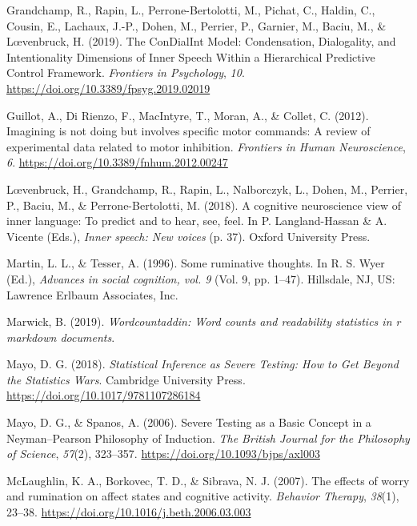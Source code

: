 \documentclass[
  english,
  man, donotrepeattitle,mask,floatsintext]{apa6}
\newlength{\cslhangindent}
\newlength{\cslentryspacingunit} %
\newenvironment{CSLReferences}[2] %
 {%
  \setlength{\parindent}{0pt}
  \ifodd #1
  \let\oldpar\par
  \def\par{\hangindent=\cslhangindent\oldpar}
  \fi
  \setlength{\parskip}{#2\cslentryspacingunit}
 }%
 {}
\begin{document}
\begin{CSLReferences}{1}{0}
\leavevmode{}%
Grandchamp, R., Rapin, L., Perrone-Bertolotti, M., Pichat, C., Haldin, C., Cousin, E., Lachaux, J.-P., Dohen, M., Perrier, P., Garnier, M., Baciu, M., \& Lœvenbruck, H. (2019). The {ConDialInt Model}: Condensation, {Dialogality}, and {Intentionality Dimensions} of {Inner Speech Within} a {Hierarchical Predictive Control Framework}. \emph{Frontiers in Psychology}, \emph{10}. \url{https://doi.org/10.3389/fpsyg.2019.02019}

\leavevmode{}%
Guillot, A., Di Rienzo, F., MacIntyre, T., Moran, A., \& Collet, C. (2012). Imagining is not doing but involves specific motor commands: A review of experimental data related to motor inhibition. \emph{Frontiers in Human Neuroscience}, \emph{6}. \url{https://doi.org/10.3389/fnhum.2012.00247}

\leavevmode{}%
Lœvenbruck, H., Grandchamp, R., Rapin, L., Nalborczyk, L., Dohen, M., Perrier, P., Baciu, M., \& Perrone-Bertolotti, M. (2018). A cognitive neuroscience view of inner language: To predict and to hear, see, feel. In P. Langland-Hassan \& A. Vicente (Eds.), \emph{Inner speech: New voices} (p. 37). {Oxford University Press}.

\leavevmode{}%
Martin, L. L., \& Tesser, A. (1996). Some ruminative thoughts. In R. S. Wyer (Ed.), \emph{Advances in social cognition, vol. 9} (Vol. 9, pp. 1--47). {Hillsdale, NJ, US: Lawrence Erlbaum Associates, Inc}.

\leavevmode{}%
Marwick, B. (2019). \emph{Wordcountaddin: Word counts and readability statistics in r markdown documents}.

\leavevmode{}%
Mayo, D. G. (2018). \emph{Statistical {Inference} as {Severe Testing}: How to {Get Beyond} the {Statistics Wars}}. {Cambridge University Press}. \url{https://doi.org/10.1017/9781107286184}

\leavevmode{}%
Mayo, D. G., \& Spanos, A. (2006). Severe {Testing} as a {Basic Concept} in a {Neyman}--{Pearson Philosophy} of {Induction}. \emph{The British Journal for the Philosophy of Science}, \emph{57}(2), 323--357. \url{https://doi.org/10.1093/bjps/axl003}

\leavevmode{}%
McLaughlin, K. A., Borkovec, T. D., \& Sibrava, N. J. (2007). The effects of worry and rumination on affect states and cognitive activity. \emph{Behavior Therapy}, \emph{38}(1), 23--38. \url{https://doi.org/10.1016/j.beth.2006.03.003}


\end{CSLReferences}
\end{document}
